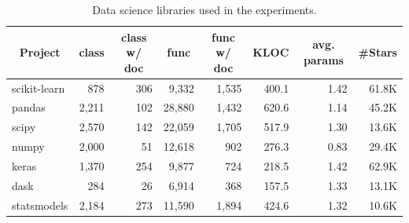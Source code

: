 \begin{landscape}
\begin{table}[]
\centering
\caption{Data science libraries used in the experiments.}
\begin{tabular}{lrrrrrrr}
\hline
\multicolumn{1}{c}{Project} & \multicolumn{1}{c}{class} & \multicolumn{1}{c}{class w/ doc} & \multicolumn{1}{c}{func} & \multicolumn{1}{c}{func w/ doc} & \multicolumn{1}{c}{KLOC} & \multicolumn{1}{c}{avg. params} & \multicolumn{1}{c}{\#Stars} \\ \hline
scikit-learn                & 878                       & 306                              & 9,332                    & 1,535                            & 400.1                    & 1.42                            & 61.8K                      \\
pandas                      & 2,211                     & 102                              & 28,880                   & 1,432                            & 620.6                    & 1.14                            & 45.2K                      \\
scipy                       & 2,570                     & 142                              & 22,059                   & 1,705                            & 517.9                    & 1.30                            & 13.6K                      \\
numpy                       & 2,000                     & 51                               & 12,618                   & 902                             & 276.3                    & 0.83                            & 29.4K                      \\ \hline
keras                       & 1,370                     & 254                              & 9,877                    & 724                             & 218.5                    & 1.42                            & 62.9K                     \\
dask                        & 284                       & 26                               & 6,914                    & 368                             & 157.5                    & 1.33                            & 13.1K                      \\
statsmodels                 & 2,184                     & 273                              & 11,590                   & 1,894                           & 424.6                    & 1.32                            & 10.6K                      \\ \hline
\end{tabular}
\label{tab:subjects}
\end{table}
\end{landscape}


